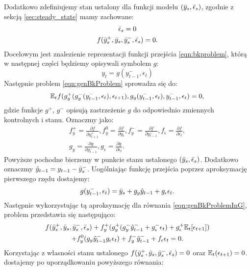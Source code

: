 Dodatkowo zdefiniujemy stan ustalony dla funkcji modelu $(\bar{y}_s, \bar{\epsilon}_s)$, zgodnie z sekcją \ref{sec:steady_state} mamy zachowane:
\begin{gather}
    \bar{\epsilon}_s = 0 \\
    f(\bar{y}_s^+, \bar{y}_s, \bar{y}_s^-, \bar{\epsilon}_s) = 0.
\end{gather}
Docelowym jest znalezienie reprezentacji funkcji przejścia \eqref{eqn:bkproblem}, którą w następnej części będziemy opisywali symbolem $g$:
\begin{equation}
    \label{eq:bk_general_state_function}
    y_t = g(y^-_{t-1}, \epsilon_t)
\end{equation}
Następnie problem \eqref{eqn:genBkProblem} sprowadza się do:
\begin{equation}
    \label{eqn:genBkProblemInG}
    \mathbb{E}_t f(g_y^+(g_y^-(y_{t-1}^-, \epsilon_t), \epsilon_{t+1}), g_y(y_{t-1}^-, \epsilon_t), y_{t-1}^-, \epsilon_t) = 0,
\end{equation}
gdzie funkcje $g^+$, $g^-$ opisują zastrzeżenie $g$ do odpowiednio zmiennych kontrolnych i stanu. Oznaczmy jako:
\begin{gather}
    f_y^+ = \frac{\partial f}{\partial y_{t+1}^+},
    f_y^0 = \frac{\partial f}{\partial y_{t}},
    f_y^- = \frac{\partial f}{\partial y_{t-1}^-},
    f_\epsilon = \frac{\partial f}{\partial \epsilon_t}, \\
    g_y = \frac{\partial g}{\partial y_{t-1}^-}, g_\epsilon = \frac{\partial g}{\partial \epsilon_t}.
\end{gather}
Powyższe pochodne bierzemy w punkcie stanu ustalonego $(\bar{y}_s, \bar{\epsilon}_s)$. Dodatkowo oznaczmy $\hat{y}_{t-1} = y_{t-1} - \bar{y}_s^-$. Uogólniając funkcję przejścia poprzez aproksymację pierwszego rzędu dostajemy:
\begin{equation}
    g(y_{t-1}^-, \epsilon_t) = \bar{y}_s + g_y \hat{y}_{t-1} + g_\epsilon \epsilon_t.
\end{equation}
Następnie wykorzystując tą aproksymację dla równania \eqref{eqn:genBkProblemInG}, problem przedstawia się następująco:
\begin{multline}
    f(\bar{y}_s^+, \bar{y}_s, \bar{y}_s^-, \bar{\epsilon}_s) + f_y^+(g_y^+(g_y^-\hat{y}_{t-1}^- + g_\epsilon^-\epsilon_t) + g_\epsilon^+\mathbb{E}_t[\epsilon_{t+1}]) \\ + f_y^0(g_y \hat{y}_{t-1}^- g_\epsilon \epsilon_t) + f_y^- \hat{y}_{t-1}^- + f_\epsilon \epsilon_t = 0.
\end{multline}
Korzystając z własności stanu ustalonego $f(\bar{y}_s^+, \bar{y}_s, \bar{y}_s^-, \bar{\epsilon}_s) = 0$ oraz $\mathbb{E}_t(\epsilon_{t+1}) = 0$. dostajemy po uporządkowaniu powyższego równania:
